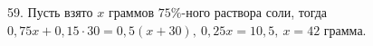 59. Пусть взято $x$ граммов $75\%$-ного раствора соли, тогда $0,75x+0,15\cdot30=0,5(x+30),\ 0,25x=10,5,\ x=42$ грамма.\\
